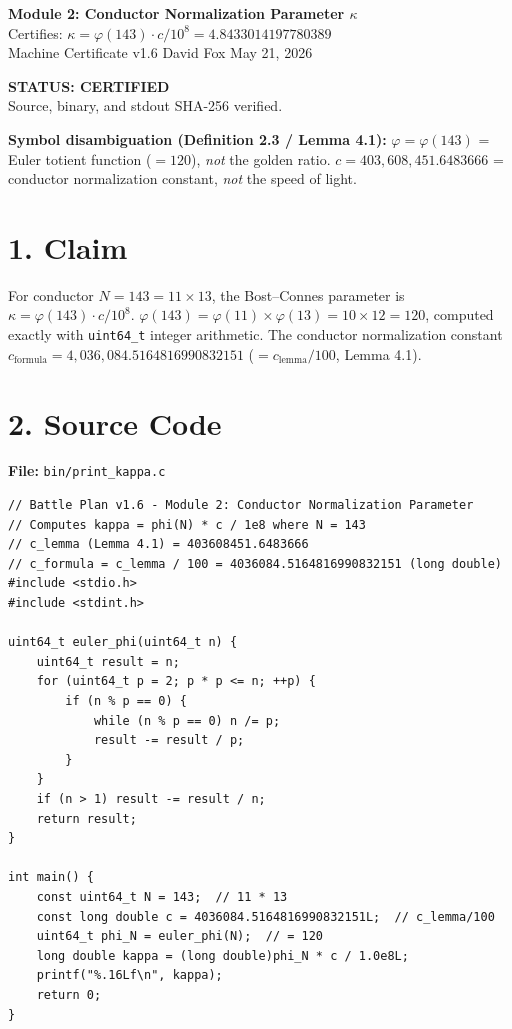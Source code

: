 \documentclass[11pt,letterpaper]{article}
\begin{document}
\begin{center}
{\Large\bfseries Module 2: Conductor Normalization Parameter $\kappa$}\\[4pt]
{\large Certifies: $\kappa = \varphi(143) \cdot c / 10^8 = 4.8433014197780389$}\\[2pt]
{\normalsize Machine Certificate v1.6 \quad David Fox \quad May 21, 2026}
\end{center}
\vspace{0.5em}
\begin{center}
\colorbox{certgreen!15}{\parbox{0.85\textwidth}{\centering
\textcolor{certgreen}{\bfseries STATUS: CERTIFIED \checkmark}\\
Source, binary, and stdout SHA-256 verified.
}}
\end{center}

\vspace{0.5em}
\noindent\textbf{Symbol disambiguation (Definition 2.3 / Lemma 4.1):}
$\varphi = \varphi(143)$ = Euler totient function ($= 120$), \emph{not} the golden ratio.
$c = 403{,}608{,}451.6483666$ = conductor normalization constant, \emph{not} the speed of light.

\section*{1. Claim}

For conductor $N = 143 = 11 \times 13$, the Bost--Connes parameter is
$\kappa = \varphi(143) \cdot c / 10^8$.
$\varphi(143) = \varphi(11) \times \varphi(13) = 10 \times 12 = 120$,
computed exactly with \texttt{uint64\_t} integer arithmetic.
The conductor normalization constant
$c_\mathrm{formula} = 4{,}036{,}084.5164816990832151$
($= c_\mathrm{lemma} / 100$, Lemma 4.1).

\section*{2. Source Code}

\textbf{File:} \texttt{bin/print\_kappa.c}
\begin{lstlisting}
// Battle Plan v1.6 - Module 2: Conductor Normalization Parameter
// Computes kappa = phi(N) * c / 1e8 where N = 143
// c_lemma (Lemma 4.1) = 403608451.6483666
// c_formula = c_lemma / 100 = 4036084.5164816990832151 (long double)
#include <stdio.h>
#include <stdint.h>

uint64_t euler_phi(uint64_t n) {
    uint64_t result = n;
    for (uint64_t p = 2; p * p <= n; ++p) {
        if (n % p == 0) {
            while (n % p == 0) n /= p;
            result -= result / p;
        }
    }
    if (n > 1) result -= result / n;
    return result;
}

int main() {
    const uint64_t N = 143;  // 11 * 13
    const long double c = 4036084.5164816990832151L;  // c_lemma/100
    uint64_t phi_N = euler_phi(N);  // = 120
    long double kappa = (long double)phi_N * c / 1.0e8L;
    printf("%.16Lf\n", kappa);
    return 0;
}
\end{lstlisting}
\end{document}
